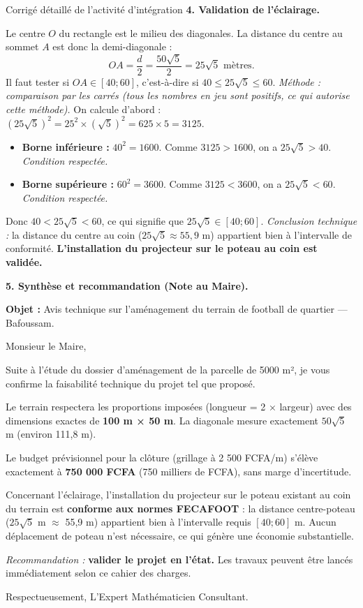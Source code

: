 \documentclass[11pt]{article}
\begin{document}
\begin{exoresolu}{Corrigé détaillé de l'activité d'intégration}
\textbf{4. Validation de l'éclairage.}\par
Le centre $O$ du rectangle est le milieu des diagonales. La distance du centre au sommet $A$ est donc la demi-diagonale :
\[ OA = \frac{d}{2} = \frac{50\sqrt{5}}{2} = 25\sqrt{5} \text{ mètres}. \]
Il faut tester si $OA \in [40 ; 60]$, c'est-à-dire si $40 \le 25\sqrt{5} \le 60$.
\emph{Méthode : comparaison par les carrés (tous les nombres en jeu sont positifs, ce qui autorise cette méthode).}
On calcule d'abord : $(25\sqrt{5})^2 = 25^2 \times (\sqrt{5})^2 = 625 \times 5 = 3125$.
\begin{itemize}
    \item \textbf{Borne inférieure :} $40^2 = 1600$. Comme $3125 > 1600$, on a $25\sqrt{5} > 40$. \emph{Condition respectée.}
    \item \textbf{Borne supérieure :} $60^2 = 3600$. Comme $3125 < 3600$, on a $25\sqrt{5} < 60$. \emph{Condition respectée.}
\end{itemize}
Donc $40 < 25\sqrt{5} < 60$, ce qui signifie que $25\sqrt{5} \in [40 ; 60]$.
\emph{Conclusion technique :} la distance du centre au coin ($25\sqrt{5} \approx 55,9$ m) appartient bien à l'intervalle de conformité. \textbf{L'installation du projecteur sur le poteau au coin est validée.}

\textbf{5. Synthèse et recommandation (Note au Maire).}\par
\textbf{Objet :} Avis technique sur l'aménagement du terrain de football de quartier — Bafoussam.

Monsieur le Maire,

Suite à l'étude du dossier d'aménagement de la parcelle de 5000 m², je vous confirme la faisabilité technique du projet tel que proposé.

Le terrain respectera les proportions imposées (longueur = 2 × largeur) avec des dimensions exactes de \textbf{100 m × 50 m}. La diagonale mesure exactement $50\sqrt{5}$ m (environ 111,8 m).

Le budget prévisionnel pour la clôture (grillage à 2 500 FCFA/m) s'élève exactement à \textbf{750 000 FCFA} (750 milliers de FCFA), sans marge d'incertitude.

Concernant l'éclairage, l'installation du projecteur sur le poteau existant au coin du terrain est \textbf{conforme aux normes FECAFOOT} : la distance centre-poteau ($25\sqrt{5}$ m $\approx$ 55,9 m) appartient bien à l'intervalle requis $[40 ; 60]$ m. Aucun déplacement de poteau n'est nécessaire, ce qui génère une économie substantielle.

\emph{Recommandation :} \textbf{valider le projet en l'état.} Les travaux peuvent être lancés immédiatement selon ce cahier des charges.

Respectueusement,
L'Expert Mathématicien Consultant.
\end{exoresolu}
\end{document}
